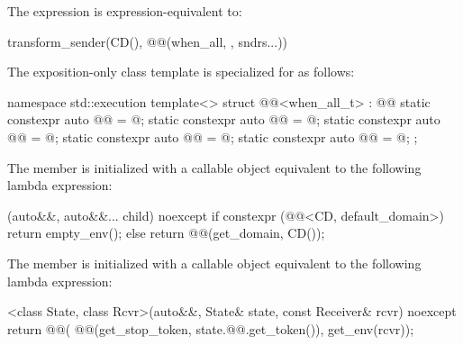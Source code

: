 \pnum
The expression  is expression-equivalent to:
\begin{codeblock}
transform_sender(CD(), @@(when_all, {}, sndrs...))
\end{codeblock}

\pnum
The exposition-only class template 
is specialized for  as follows:
\begin{codeblock}
namespace std::execution {
  template<>
  struct @@<when_all_t> : @@ {
    static constexpr auto @@ = @\seebelow@;
    static constexpr auto @@ = @\seebelow@;
    static constexpr auto @@ = @\seebelow@;
    static constexpr auto @@ = @\seebelow@;
    static constexpr auto @@ = @\seebelow@;
  };
}
\end{codeblock}

\pnum
The member 
is initialized with a callable object
equivalent to the following lambda expression:
\begin{codeblock}
[](auto&&, auto&&... child) noexcept {
  if constexpr (@@<CD, default_domain>) {
    return empty_env();
  } else {
    return @@(get_domain, CD());
  }
}
\end{codeblock}

\pnum
The member 
is initialized with a callable object
equivalent to the following lambda expression:
\begin{codeblock}
[]<class State, class Rcvr>(auto&&, State& state, const Receiver& rcvr) noexcept {
  return @@(
    @@(get_stop_token, state.@@.get_token()), get_env(rcvr));
}
\end{codeblock}

